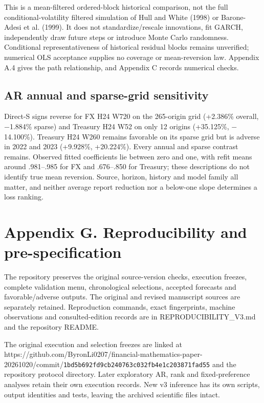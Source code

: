\documentclass[10pt,a4paper]{article}
\begin{document}
This is a mean-filtered ordered-block historical comparison, not the full conditional-volatility filtered simulation of Hull and White (1998) or Barone-Adesi et al. (1999). It does not standardize/rescale innovations, fit GARCH, independently draw future steps or introduce Monte Carlo randomness. Conditional representativeness of historical residual blocks remains unverified; numerical OLS acceptance supplies no coverage or mean-reversion law. Appendix A.4 gives the path relationship, and Appendix C records numerical checks.

\subsection*{AR annual and sparse-grid sensitivity}
Direct-S signs reverse for FX H24 W720 on the 265-origin grid (+2.386\% overall, \(-\)1.884\% sparse) and Treasury H24 W52 on only 12 origins (+35.125\%, \(-\)14.100\%). Treasury H24 W260 remains favorable on its sparse grid but is adverse in 2022 and 2023 (+9.928\%, +20.224\%). Every annual and sparse contrast remains. Observed fitted coefficients lie between zero and one, with refit means around .981--.985 for FX and .676--.850 for Treasury; these descriptions do not identify true mean reversion. Source, horizon, history and model family all matter, and neither average report reduction nor a below-one slope determines a loss ranking.

\section*{Appendix G. Reproducibility and pre-specification}
The repository preserves the original source-version checks, execution freezes, complete validation menu, chronological selections, accepted forecasts and favorable/adverse outputs. The original and revised manuscript sources are separately retained. Reproduction commands, exact fingerprints, machine observations and consulted-edition records are in REPRODUCIBILITY\_V3.md and the repository README.

The original execution and selection freezes are linked at https://github.com/ByronLi0207/financial-mathematics-paper-20261020/commit/\texttt{1bd5b692fd9cb240}\allowbreak\texttt{763c032fb4e1c203}\allowbreak\texttt{871fad55} and the repository protocol directory. Later exploratory AR, rank and fixed-preference analyses retain their own execution records. New v3 inference has its own scripts, output identities and tests, leaving the archived scientific files intact.
\end{document}
